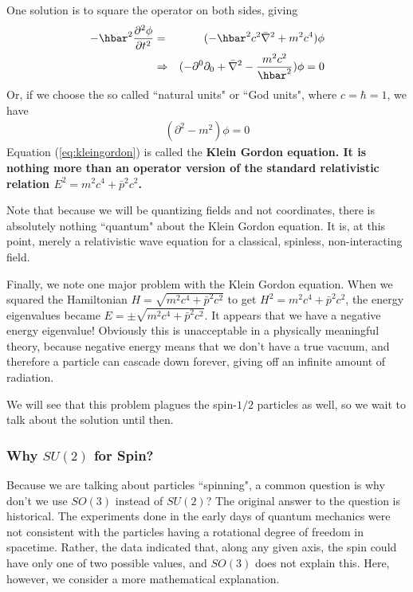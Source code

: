 \documentclass[12pt,epsf]{article}
\def\nolabel{\nonumber }
\def\nolabel{\nonumber }
\begin{document}
One solution is to square the operator on both sides, giving
\begin{eqnarray}
-\hbar^2{\partial^2 \phi \over \partial t^2} &=& (-\hbar^2c^2\bar
\nabla^2 + m^2c^4)\phi \nolabel \\
&\Rightarrow& (-\partial^0\partial_0 + \bar \nabla^2 -{m^2c^2\over
\hbar^2})\phi = 0\nolabel
\end{eqnarray}
Or, if we choose the so called ``natural units" or ``God units", where
$c=\hbar = 1$, we have 
\begin{eqnarray}
(\partial^2  - m^2)\phi = 0 \label{eq:kleingordon}
\end{eqnarray}
Equation (\ref{eq:kleingordon}) is called the \bf Klein Gordon \rm
equation.  It is nothing more than an operator version of the standard
relativistic relation $E^2 = m^2c^4+\bar p^2c^2$.  

Note that because we will be quantizing fields and not coordinates,
there is absolutely nothing ``quantum" about the Klein Gordon equation.
 It is, at this point, merely a relativistic wave equation for a
classical, spinless, non-interacting field.  

Finally, we note one major problem with the Klein Gordon equation. 
When we squared the Hamiltonian $H=\sqrt{m^2c^4+\bar p^2c^2}$ to get
$H^2 = m^2c^4+\bar p^2c^2$, the energy eigenvalues became
$E=\pm\sqrt{m^2c^4+\bar p^2c^2}$.  It appears that we have a negative
energy	eigenvalue!  Obviously this is unacceptable in a physically
meaningful theory, because negative energy means that we don't have a
true vacuum, and therefore a particle can cascade down forever, giving
off an infinite amount of radiation.  

We will see that this problem plagues the spin-$1/2$ particles as well,
so we wait to talk about the solution until then.  

\subsubsection{Why $SU(2)$ for Spin?}

Because we are talking about particles ``spinning", a common question
is why don't we use $SO(3)$ instead of $SU(2)$?  The original answer to
the question is historical.  The experiments done in the early days of
quantum mechanics were not consistent with the particles having a
rotational degree of freedom in spacetime.  Rather, the data indicated
that, along any given axis, the spin could have only one of two
possible values, and $SO(3)$ does not explain this.  Here, however, we
consider a more mathematical explanation.  
\end{document}

